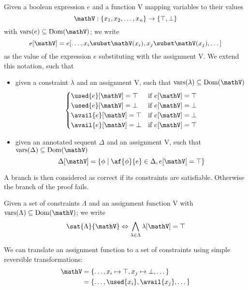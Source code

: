 \begin{define}[Evaluation]
	Given a boolean expression $e$ and a function V mapping variables to their values 
	$$ \mathV : \{ x_1, x_2, \dots, x_n \} \rightarrow \{ \top, \bot \} $$
	with $\mathrm{vars}(e) \subseteq \mathrm{Dom}(\mathV)$; we write
		$$ e[\mathV] = e[\dots, x_i \subst \mathV(x_i), x_j \subst \mathV(x_j), \dots] $$
	as the value of the expression $e$ substituting with the assignment V.
	We extend this notation, such that
	\begin{itemize}
		\item given a constraint $\lambda$ and an assignment V, such that $\mathrm{vars}(\lambda) \subseteq \mathrm{Dom}(\mathV)$
			$$ 
			\begin{cases} 
				\used{e}[\mathV] = \top & \text{if } e[\mathV] = \top \\
				\used{e}[\mathV] = \bot & \text{if } e[\mathV] = \bot \\
				\avail{e}[\mathV] = \top & \text{if } e[\mathV] = \bot \\
				\avail{e}[\mathV] = \bot & \text{if } e[\mathV] = \top \\
			\end{cases}
			$$
		\item given an annotated sequent $\Delta$ and an assignment V, such that $\mathrm{vars}(\Delta) \subseteq \mathrm{Dom}(\mathV)$
			$$ \Delta[\mathV] = \{ \phi \mid \af{\phi}{e} \in \Delta , e[\mathV] = \top \} $$
	\end{itemize}
\end{define}
A branch is then considered as correct if its constraints are satisfiable.
Otherwise the branch of the proof fails.
\begin{define}
	\label{def:sat}
	Given a set of constraints $\Lambda$ and an assignment function V with $\mathrm{vars}(\Lambda) \subseteq \mathrm{Dom}(\mathV)$; we write 
	$$ \sat{\Lambda}{\mathV} \Leftrightarrow \bigwedge_{\lambda \in \Lambda} \lambda[\mathV] = \top $$
\end{define}
\begin{fact}
	\label{fact:ass-trans}
	We can translate an assignment function to a set of constraints using simple reversible transformations:
	\begin{align*}
		\mathV &= \{ \dots, x_i \mapsto \top, x_j \mapsto \bot, \dots \} \\
		       &= \{ \dots, \used{x_i}, \avail{x_j}, \dots \}
	\end{align*}
\end{fact}


